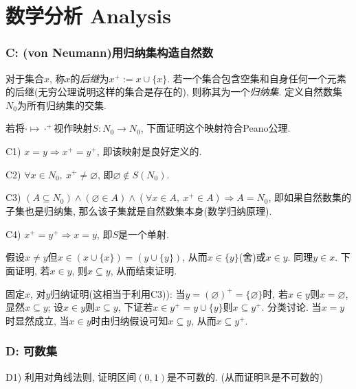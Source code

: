 \chapter{数学分析 Analysis}


\subsection*{C: (von Neumann)用归纳集构造自然数}

对于集合$x$, 称$x$的\textit{后继}为$x^+ := x \cup \{ x \}$. 若一个集合包含空集和自身任何一个元素的后继(无穷公理说明这样的集合是存在的), 则称其为一个\textit{归纳集}. 定义自然数集$N_0$为所有归纳集的交集. 

若将$\cdot \mapsto \cdot ^{+}$视作映射$S:N_0 \to N_0$, 下面证明这个映射符合Peano公理. 

C1) $x=y \Rightarrow x^+=y^+$, 即该映射是良好定义的. 

C2) $\forall x \in N_0,~x^+ \neq \varnothing$, 即$\varnothing \notin S(N_0)$. 

C3) $(A \subseteq N_0) \wedge (\varnothing \in A) \wedge (\forall x \in A,~x^+ \in A) \Rightarrow A=N_0$, 即如果自然数集的子集也是归纳集, 那么该子集就是自然数集本身(数学归纳原理). 

C4) $x^+=y^+ \Rightarrow x=y$, 即$S$是一个单射.

\begin{solution}
	假设$x\neq y$但$x \in (x \cup \{ x \})=(y \cup \{ y \})$, 从而$x \in \{ y \}$(舍)或$x \in y$. 同理$y \in x$. 下面证明, 若$x \in y$, 则$x \subseteq y$, 从而结束证明.
	
	固定$x$, 对$y$归纳证明(这相当于利用C3)): 当$y= (\varnothing )^+=\{ \varnothing \}$时, 若$x \in y$则$x = \varnothing$, 显然$x \subseteq y$; 设$x \in y$则$x \subseteq y$, 下证若$x \in y^+=y \cup \{ y \}$则$x \subseteq y^+$. 分类讨论. 当$x=y$时显然成立, 当$x \in y$时由归纳假设可知$x \subseteq y$, 从而$x \subseteq y^+$. 
\end{solution}

\subsection*{D: 可数集}

D1) 利用对角线法则, 证明区间$(0,1)$是不可数的. (从而证明$\mathbb{R}$是不可数的)


